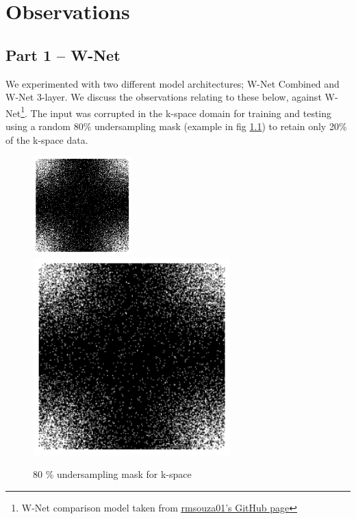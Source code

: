 \def\baselinestretch{1}
\chapter{Observations} \label{Observations chapter}
\ifpdf
    \graphicspath{{Conclusions/ConclusionsFigs/PNG/}{Conclusions/ConclusionsFigs/PDF/}{Conclusions/ConclusionsFigs/}}
\else
    \graphicspath{{Conclusions/ConclusionsFigs/EPS/}{Conclusions/ConclusionsFigs/}}
\fi

\def\baselinestretch{1.66}

\section{Part 1 -- W-Net}\label{sec:ob_wnet}

We experimented with two different model architectures; W-Net Combined and W-Net 3-layer. We discuss the observations relating to these below, against W-Net\footnote{W-Net comparison model taken from \underline{\href{https://github.com/rmsouza01/Hybrid-CS-Model-MRI}{rmsouza01's GitHub page}}}. The input was corrupted in the k-space domain for training and testing using a random 80\% undersampling mask (example in fig \ref{k-space mask}) to retain only 20\% of the k-space data.


\begin{figure}[!htbp]
  \begin{center}
    \leavevmode
    \ifpdf
      \includegraphics[height=1.5in]{Chapter4/images/k-space-mask.png}
    \else
      \includegraphics[bb = 92 86 545 742, height=3in]{Chapter4/images/k-space-mask.png}
    \fi
    \caption{80 \% undersampling mask for k-space}
    \label{k-space mask}
  \end{center}
\end{figure}



